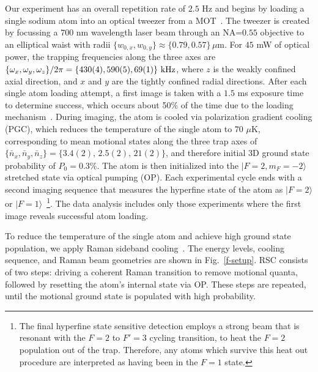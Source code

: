 \documentclass[aps,prl,twocolumn,groupedaddress]{revtex4-1}
\begin{document}
Our experiment has an overall repetition rate of $2.5$ Hz and
begins by loading a single sodium atom into an optical tweezer from a MOT~\cite{Hutzler2017-LightShifts}.
The tweezer is created by focussing a $700$ nm wavelength laser beam through an NA=$0.55$ objective to an elliptical waist with radii $\{w_{0,x},w_{0,y}\}\approx \{0.79,0.57\}\,\mu$m.
For $45$ mW of optical power, the trapping frequencies along the three axes are
$\{\omega_x,\omega_y,\omega_z\}/2\pi = \{430(4), 590(5), 69(1)\}\ \text{\text{kHz}}$,
where $z$ is the weakly confined axial direction,
and $x$ and $y$ are the tightly confined radial directions.
After each single atom loading attempt, a first image is taken with a $1.5$ ms exposure time
to determine success, which occurs about 50\% of the time due to the loading mechanism~\cite{Schlosser2001}.
During imaging, the atom is cooled via polarization gradient cooling (PGC),
which reduces the temperature of the single atom to $70$ $\mu$K,
corresponding to mean motional states along the three trap axes of
$\{\bar n_x, \bar n_y, \bar n_z\}=\{3.4(2),\, 2.5(2),\, 21(2)\}$, and therefore initial 3D ground state probability of $P_0=0.3$\%.
The atom is then initialized into
the $|F=2, m_F=-2\rangle$ stretched state via optical pumping (OP).
Each experimental cycle ends with a second imaging sequence that measures the hyperfine state of the atom as $|F=2\rangle$ or $|F=1\rangle$~\footnote{The final hyperfine state sensitive detection employs a strong beam that is resonant with the $F=2$ to $F'=3$ cycling transition, to heat the $F=2$ population out of the trap. Therefore, any atoms which survive this heat out procedure are interpreted as having been in the $F=1$ state.}. The data analysis includes only those experiments where the first image reveals successful atom loading.

To reduce the temperature of the single atom and
 achieve high ground state population, we apply Raman sideband cooling~\cite{Monroe1995, Kaufman2012}.
The energy levels, cooling sequence, and Raman beam geometries
are shown in Fig.~\ref{f-setup}. RSC consists of two steps:
driving a coherent Raman transition to remove motional quanta, followed by resetting the atom's internal state via OP.
These steps are repeated, until the motional ground state is populated with high probability.
\end{document}
